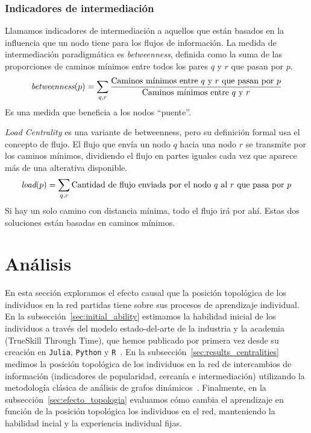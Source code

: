 \documentclass[a4paper,11pt]{book}
\theoremstyle{definition}
\begin{document}
\subsubsection{Indicadores de intermediaci\'on}

Llamamos indicadores de intermediaci\'on a aquellos que est\'an basados en la influencia que un nodo tiene para los flujos de informaci\'on.
%
La medida de intermediaci\'on paradigm\'atica es \emph{betweenness}, definida como la suma de las proporciones de caminos m\'inimos entre todos los pares $q$ y $r$ que pasan por $p$.
%
\begin{equation}
	\emph{betweenness}(p) = { \sum_{q,r}\frac{\text{Caminos m\'inimos entre $q$ y $r$ que pasan por $p$}}{\text{Caminos m\'inimos entre $q$ y $r$}}}
\end{equation}
%
Es una medida que beneficia a los nodos ``puente''.


\emph{Load Centrality} es una variante de betweenness, pero su definici\'on formal usa el concepto de flujo.
%
El flujo que env\'ia un nodo $q$ hacia una nodo $r$ se transmite por los caminos m\'inimos, dividiendo el flujo en partes iguales cada vez que aparece m\'as de una alterativa disponible.
%
\begin{equation}
	\emph{load}(p)= { \sum_{q,r} \text{Cantidad de flujo enviada por el nodo $q$ al $r$ que pasa por $p$} }
\end{equation}
%
Si hay un solo camino con distancia m\'inima, todo el flujo ir\'a por ah\'i.
%
Estas dos soluciones est\'an basadas en caminos m\'inimos.


\section{An\'alisis}

En esta secci\'on exploramos el efecto causal que la posici\'on topol\'ogica de los individuos en la red partidas tiene sobre sus procesos de aprendizaje individual.
%
En la subsecci\'on~\ref{sec:initial_ability} estimamos la habilidad inicial de los individuos a trav\'es del modelo estado-del-arte de la industria y la academia (TrueSkill Through Time), que hemos publicado por primera vez desde su creaci\'on en \texttt{Julia}, \texttt{Python} y \texttt{R}~\cite{Landfried2021-TTT}.
%
En la subsecci\'on~\ref{sec:results_centralities} medimos la posici\'on topol\'ogica de los individuos en la red de intercambios de informaci\'on (indicadores de popularidad, cercan\'ia e intermediaci\'on) utilizando la metodolog\'ia cl\'asica de an\'alisis de grafos din\'amicos~\cite{Kossinets2006, Mcgregor2014}.
%
Finalmente, en la subsecci\'on~\ref{sec:efecto_topologia} evaluamos c\'omo cambia el aprendizaje en funci\'on de la posici\'on topol\'ogica los individuos en el red, manteniendo la habilidad incial y la experiencia individual fijas.
\end{document}
